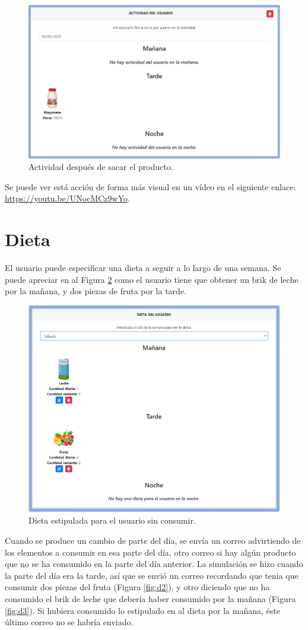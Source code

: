 \begin{figure}[h] 
    \centering
    \includegraphics[width=.70\textwidth]{capitulos/capitulo10/actividad/2.png}
    \caption{Actividad después de sacar el producto.}
    \label{fig:a2}
\end{figure}

\newpage
Se puede ver está acción de forma más visual en un vídeo en el siguiente enlace: \url{https://youtu.be/UNocMCz9wYo}.

\section{Dieta}
El usuario puede especificar una dieta a seguir a lo largo de una semana. Se puede apreciar en al Figura \ref{fig:d1} como el usuario tiene que obtener un brik de leche por la mañana, y dos piezas de fruta por la tarde.

\begin{figure}[h] 
    \centering
    \includegraphics[width=.60\textwidth]{capitulos/capitulo10/dieta/1.png}
    \caption{Dieta estipulada para el usuario sin consumir.}
    \label{fig:d1}
\end{figure}

\newpage
Cuando se produce un cambio de parte del día, se envía un correo advirtiendo de los elementos a consumir en esa parte del día, otro correo si hay algún producto que no se ha consumido en la parte del día anterior. La simulación se hizo cuando la parte del día era la tarde, así que se envió un correo recordando que tenia que consumir dos piezas del fruta (Figura \ref{fig:d2}), y otro diciendo que no ha consumido el brik de leche que debería haber consumido por la mañana (Figura \ref{fig:d3}). Si hubiera consumido lo estipulado en al dieta por la mañana, éste último correo no se habría enviado.

